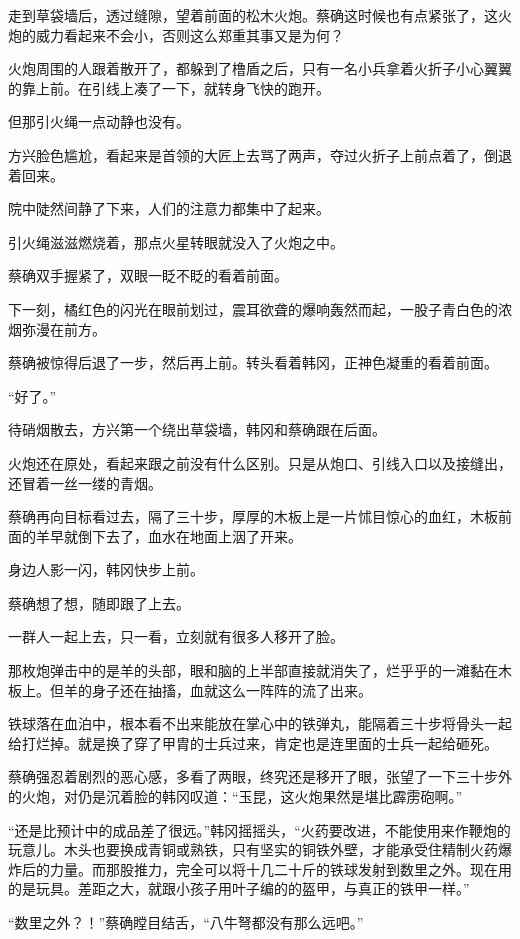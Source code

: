 走到草袋墙后，透过缝隙，望着前面的松木火炮。蔡确这时候也有点紧张了，这火炮的威力看起来不会小，否则这么郑重其事又是为何？

火炮周围的人跟着散开了，都躲到了橹盾之后，只有一名小兵拿着火折子小心翼翼的靠上前。在引线上凑了一下，就转身飞快的跑开。

但那引火绳一点动静也没有。

方兴脸色尴尬，看起来是首领的大匠上去骂了两声，夺过火折子上前点着了，倒退着回来。

院中陡然间静了下来，人们的注意力都集中了起来。

引火绳滋滋燃烧着，那点火星转眼就没入了火炮之中。

蔡确双手握紧了，双眼一眨不眨的看着前面。

下一刻，橘红色的闪光在眼前划过，震耳欲聋的爆响轰然而起，一股子青白色的浓烟弥漫在前方。

蔡确被惊得后退了一步，然后再上前。转头看着韩冈，正神色凝重的看着前面。

“好了。”

待硝烟散去，方兴第一个绕出草袋墙，韩冈和蔡确跟在后面。

火炮还在原处，看起来跟之前没有什么区别。只是从炮口、引线入口以及接缝出，还冒着一丝一缕的青烟。

蔡确再向目标看过去，隔了三十步，厚厚的木板上是一片怵目惊心的血红，木板前面的羊早就倒下去了，血水在地面上洇了开来。

身边人影一闪，韩冈快步上前。

蔡确想了想，随即跟了上去。

一群人一起上去，只一看，立刻就有很多人移开了脸。

那枚炮弹击中的是羊的头部，眼和脑的上半部直接就消失了，烂乎乎的一滩黏在木板上。但羊的身子还在抽搐，血就这么一阵阵的流了出来。

铁球落在血泊中，根本看不出来能放在掌心中的铁弹丸，能隔着三十步将骨头一起给打烂掉。就是换了穿了甲胄的士兵过来，肯定也是连里面的士兵一起给砸死。

蔡确强忍着剧烈的恶心感，多看了两眼，终究还是移开了眼，张望了一下三十步外的火炮，对仍是沉着脸的韩冈叹道：“玉昆，这火炮果然是堪比霹雳砲啊。”

“还是比预计中的成品差了很远。”韩冈摇摇头，“火药要改进，不能使用来作鞭炮的玩意儿。木头也要换成青铜或熟铁，只有坚实的铜铁外壁，才能承受住精制火药爆炸后的力量。而那股推力，完全可以将十几二十斤的铁球发射到数里之外。现在用的是玩具。差距之大，就跟小孩子用叶子编的的盔甲，与真正的铁甲一样。”

“数里之外？！”蔡确瞠目结舌，“八牛弩都没有那么远吧。”

